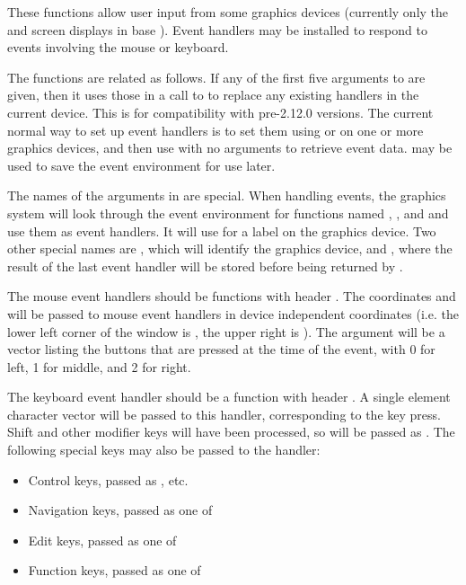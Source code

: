 \begin{Details}\relax
These functions allow user input from some graphics devices (currently
only the  and  screen displays
in base \R{}). Event handlers may be installed to respond to events
involving the mouse or keyboard.

The functions are related as follows.  If any of the first five
arguments to  are given, then it uses those
in a call to  to replace any existing
handlers in the current device.  This is for compatibility with pre-2.12.0 \R{}
versions.  The current normal way to set up event handlers is to 
set them using  or  on
one or more graphics devices, and then use  with
no arguments to retrieve event data.
 may be used to save the event environment
for use later.

The names of the arguments in  are special.  When
handling events, the graphics system will look through the event 
environment for functions named , , 
and  and use them as event handlers.  It will use 
 for a label on the graphics device.  Two other special names are
, which will identify the graphics device, and
, where the result of the last event
handler will be stored before being returned by .

The mouse event handlers should be functions with header 
.  The coordinates 
and  will be passed to mouse event handlers in device independent
coordinates (i.e. the lower left corner of the window is , 
the upper right is ).  The  argument 
will be a vector listing the buttons
that are pressed at the time of the event, with 0 for left, 1 for middle, and 2 
for right.

The keyboard event handler should be a function with header
.  A single element character vector will be passed
to this handler, corresponding to the key press.  Shift and other modifier
keys will have been processed, so  will be passed as
.  The following special keys may also be passed to the handler:
\begin{itemize}

\item Control keys, passed as , etc.
\item Navigation keys, passed as one of 
\item Edit keys, passed as one of 
\item Function keys, passed as one of 


\end{itemize}
\end{Details}
